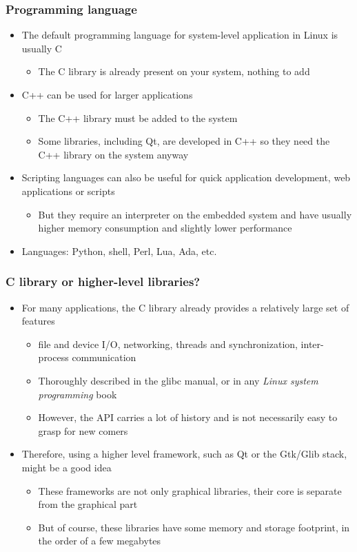 \begin{frame}
  \frametitle{Programming language}
  \begin{itemize}
  \item The default programming language for system-level application
    in Linux is usually C
    \begin{itemize}
    \item The C library is already present on your system, nothing to
      add
    \end{itemize}
  \item C++ can be used for larger applications
    \begin{itemize}
    \item The C++ library must be added to the system
    \item Some libraries, including Qt, are developed in C++ so they
      need the C++ library on the system anyway
    \end{itemize}
  \item Scripting languages can also be useful for quick application
    development, web applications or scripts
    \begin{itemize}
    \item But they require an interpreter on the embedded system and
      have usually higher memory consumption and slightly lower
      performance
    \end{itemize}
  \item Languages: Python, shell, Perl, Lua, Ada, etc.
  \end{itemize}
\end{frame}

\begin{frame}
  \frametitle{C library or higher-level libraries?}
  \begin{itemize}
  \item For many applications, the C library already provides a
    relatively large set of features
    \begin{itemize}
    \item file and device I/O, networking, threads and
      synchronization, inter-process communication
    \item Thoroughly described in the glibc manual, or in any {\em
        Linux system programming} book
    \item However, the API carries a lot of history and is not
      necessarily easy to grasp for new comers
    \end{itemize}
  \item Therefore, using a higher level framework, such as Qt or the
    Gtk/Glib stack, might be a good idea
    \begin{itemize}
    \item These frameworks are not only graphical libraries, their
      core is separate from the graphical part
    \item But of course, these libraries have some memory and storage
      footprint, in the order of a few megabytes
    \end{itemize}
  \end{itemize}
\end{frame}

